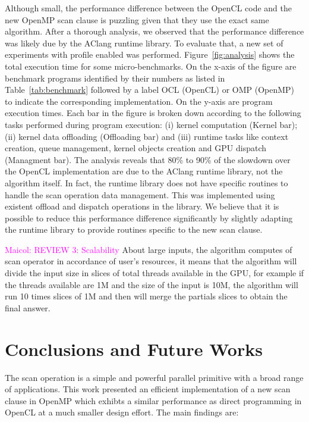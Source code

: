 \documentclass[Ingles]{ic-tese-v1}
\newcommand{\maicol}[1]{\noindent\textcolor{magenta}{Maicol: {#1}}}
\newcommand{\maicol}[1]{}
\newcommand{\rtab}[1]{Table~\ref{tab:#1}}
\begin{document}
Although small, the performance difference between the OpenCL code and
the new OpenMP  scan clause is puzzling given that  they use the exact
same   algorithm.  After a thorough analysis, we observed that the performance
difference was likely due by  the AClang runtime library.  To evaluate
that, a  new set of  experiments with profile enabled  was performed.
Figure~\ref{fig:analysis}  shows the  total  execution  time for  some
micro-benchmarks.  On the x-axis of  the figure are benchmark programs
identified by their numbers as  listed in \rtab{benchmark} followed by
a label  OCL (OpenCL)  or OMP (OpenMP)  to indicate  the corresponding
implementation. On the  y-axis are program execution  times.  Each bar
in  the  figure  is  broken  down according  to  the  following  tasks
performed  during program  execution: (i)  kernel computation  (Kernel
bar);  (ii) kernel  data offloading  (Offloading bar)  and (iii)  runtime
tasks like context creation, queue management, kernel objects creation
and GPU dispatch  (Managment bar).  The analysis reveals  that 80\% to
90\% of  the slowdown over  the OpenCL  implementation are due  to the
AClang  runtime  library, not  the  algorithm  itself.  In  fact,  the
runtime library  does not  have specific routines  to handle  the scan
operation  data management.   This was  implemented using  existent
offload and dispatch operations in the library.  We believe that it is
possible  to  reduce  this  performance  difference  significantly  by
slightly adapting the runtime library  to provide routines specific to
the new scan clause.

\maicol{REVIEW 3: Scalability}
About large inputs, the algorithm computes  of scan operator
in accordance of user's resources, it means that the algorithm will
divide the input size in slices of total threads available in the GPU,
for example if the threads available are 1M and the size of the input 
is 10M, the algorithm will run 10 times slices of 1M and then will
merge the partials slices to obtain the final answer.

\chapter{Conclusions and Future Works}
\label{cap:Conclusion}

The scan operation is a simple  and powerful parallel primitive with a
broad  range  of  applications.   This  work  presented  an  efficient
implementation of a new scan clause in OpenMP which exhibts
a similar performance as direct programming in OpenCL at a much
smaller design effort. The main findings are:
\end{document}

